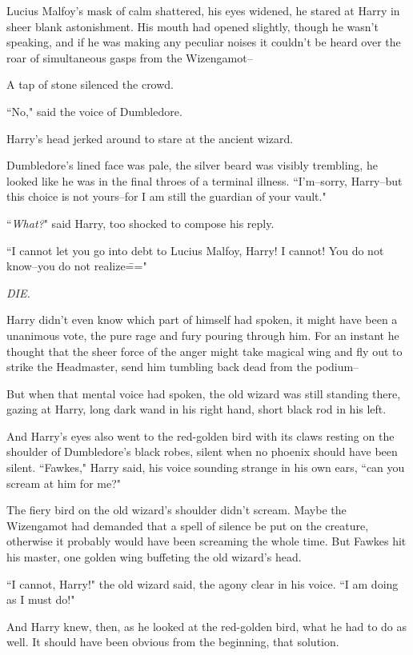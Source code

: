 Lucius Malfoy's mask of calm shattered, his eyes widened, he stared at Harry in sheer blank astonishment. His mouth had opened slightly, though he wasn't speaking, and if he was making any peculiar noises it couldn't be heard over the roar of simultaneous gasps from the Wizengamot\---

A tap of stone silenced the crowd.

``No," said the voice of Dumbledore.

Harry's head jerked around to stare at the ancient wizard.

Dumbledore's lined face was pale, the silver beard was visibly trembling, he looked like he was in the final throes of a terminal illness. ``I'm\---sorry, Harry\---but this choice is not yours\---for I am still the guardian of your vault."

``\emph{What?}" said Harry, too shocked to compose his reply.

``I cannot let you go into debt to Lucius Malfoy, Harry! I cannot! You do not know\---you do not realize\==="

\emph{DIE.}

Harry didn't even know which part of himself had spoken, it might have been a unanimous vote, the pure rage and fury pouring through him. For an instant he thought that the sheer force of the anger might take magical wing and fly out to strike the Headmaster, send him tumbling back dead from the podium\---

But when that mental voice had spoken, the old wizard was still standing there, gazing at Harry, long dark wand in his right hand, short black rod in his left.

And Harry's eyes also went to the red-golden bird with its claws resting on the shoulder of Dumbledore's black robes, silent when no phoenix should have been silent. ``Fawkes," Harry said, his voice sounding strange in his own ears, ``can you scream at him for me?"

The fiery bird on the old wizard's shoulder didn't scream. Maybe the Wizengamot had demanded that a spell of silence be put on the creature, otherwise it probably would have been screaming the whole time. But Fawkes hit his master, one golden wing buffeting the old wizard's head.

``I cannot, Harry!" the old wizard said, the agony clear in his voice. ``I am doing as I must do!"

And Harry knew, then, as he looked at the red-golden bird, what he had to do as well. It should have been obvious from the beginning, that solution.

